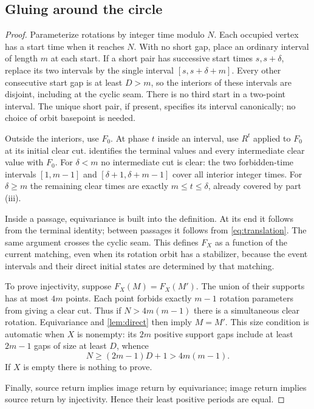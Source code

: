 \subsection{Gluing around the circle}
\begin{proof}
Parameterize rotations by integer time modulo $N$. Each occupied vertex has a start time when it reaches $N$. With no short gap, place an ordinary interval of length $m$ at each start. If a short pair has successive start times $s,s+\delta$, replace its two intervals by the single interval $[s,s+\delta+m]$. Every other consecutive start gap is at least $D>m$, so the interiors of these intervals are disjoint, including at the cyclic seam. There is no third start in a two-point interval. The unique short pair, if present, specifies its interval canonically; no choice of orbit basepoint is needed.

Outside the interiors, use $F_0$. At phase $t$ inside an interval, use $R^t$ applied to $F_0$ at its initial clear cut.  identifies the terminal values and every intermediate clear value with $F_0$. For $\delta<m$ no intermediate cut is clear: the two forbidden-time intervals $[1,m-1]$ and $[\delta+1,\delta+m-1]$ cover all interior integer times. For $\delta\ge m$ the remaining clear times are exactly $m\le t\le\delta$, already covered by part (iii).

Inside a passage, equivariance is built into the definition. At its end it follows from the terminal identity; between passages it follows from \eqref{eq:translation}. The same argument crosses the cyclic seam. This defines $F_X$ as a function of the current matching, even when its rotation orbit has a stabilizer, because the event intervals and their direct initial states are determined by that matching.

To prove injectivity, suppose $F_X(M)=F_X(M')$. The union of their supports has at most $4m$ points. Each point forbids exactly $m-1$ rotation parameters from giving a clear cut. Thus if $N>4m(m-1)$ there is a simultaneous clear rotation. Equivariance and \cref{lem:direct} then imply $M=M'$. This size condition is automatic when $X$ is nonempty: its $2m$ positive support gaps include at least $2m-1$ gaps of size at least $D$, whence
\[
 N\ge(2m-1)D+1>4m(m-1).
\]
If $X$ is empty there is nothing to prove.

Finally, source return implies image return by equivariance; image return implies source return by injectivity. Hence their least positive periods are equal.
\end{proof}

